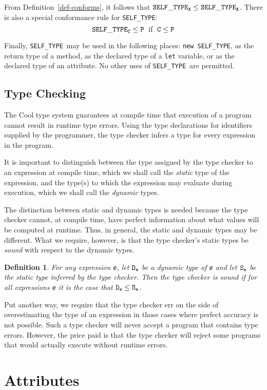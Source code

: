 \documentclass[11pt]{article}
\newcommand {\m}{\mbox}
\newtheorem{definition}[theorem]{Definition}
\newcommand{\styp}{{\tt SELF\_TYPE}}
\begin{document}
From Definition~\ref{def-conforms}, it follows that
$\styp_{\tt X} \leq \styp_{\tt X}$.
There is also a special conformance rule for \styp:
\[ \tt \styp_C \leq P \;\m{\rm\ if\ }\; C \leq P \]

Finally, \styp\ may be used in the following places: {\tt new \styp},
as the return type of a method, as the declared type of a {\tt let}
variable, or as the declared type of an attribute. No other uses of
\styp\ are permitted.

\subsection{Type Checking}

The Cool type system guarantees at compile time that execution of a program
cannot result in runtime type errors.  Using the type declarations for
identifiers supplied by the programmer, the type checker infers a type for
every expression in the program.  

It is important to distinguish between the type assigned by the type
checker to an expression at compile time, which we shall call the {\em
static} type of the expression, and the type(s) to which the
expression may evaluate during execution, which we shall call the {\em
dynamic} types.

The distinction between static and dynamic types is needed because the
type checker cannot, at compile time, have perfect information about
what values will be computed at runtime.  Thus, in general, the static and
dynamic types may be different.  What we require, however, is that the
type checker's static types be {\em sound} with respect to the dynamic types.

\begin{definition}
\rm
For any expression  {\tt e}, let $\tt D_e$ be a dynamic type of {\tt e}
and let $\tt S_e$ be the static type inferred by the type checker.
Then the type checker is {\em sound} if for all expressions {\tt e} it is the
case that $\tt D_e \leq S_e$.
\end{definition}

Put another way, we require that the type checker err on the side of
overestimating the type of an expression in those cases where perfect
accuracy is not possible.  Such a type checker will never accept a
program that contains type errors.  However, the price paid is that
the type checker will reject some programs that would actually execute
without runtime errors.

\section{Attributes}
\label{sec-attr}
\end{document}
